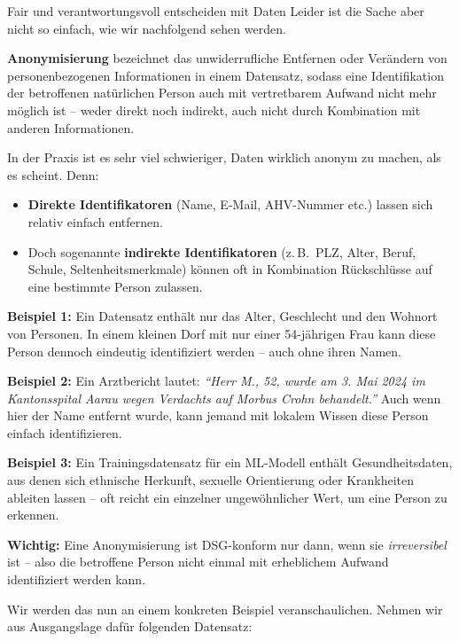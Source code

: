 \begin{lpu}{Fair und verantwortungsvoll entscheiden mit Daten}
Leider ist die Sache aber nicht so einfach, wie wir nachfolgend sehen werden.


\begin{theorie}\textbf{Anonymisierung} bezeichnet das unwiderrufliche Entfernen oder Verändern von personenbezogenen Informationen in einem Datensatz, sodass eine Identifikation der betroffenen natürlichen Person auch mit vertretbarem Aufwand nicht mehr möglich ist – weder direkt noch indirekt, auch nicht durch Kombination mit anderen Informationen.
\end{theorie}

In der Praxis ist es sehr viel schwieriger, Daten wirklich anonym zu machen, als es scheint. Denn:

\begin{itemize}
  \item \textbf{Direkte Identifikatoren} (Name, E-Mail, AHV-Nummer etc.) lassen sich relativ einfach entfernen.
  \item Doch sogenannte \textbf{indirekte Identifikatoren} (z.\,B.\ PLZ, Alter, Beruf, Schule, Seltenheitsmerkmale) können oft in Kombination Rückschlüsse auf eine bestimmte Person zulassen.
\end{itemize}

\vspace{0.5em}
\textbf{Beispiel 1:}  
Ein Datensatz enthält nur das Alter, Geschlecht und den Wohnort von Personen. In einem kleinen Dorf mit nur einer 54-jährigen Frau kann diese Person dennoch eindeutig identifiziert werden – auch ohne ihren Namen.

\vspace{0.5em}
\textbf{Beispiel 2:}  
Ein Arztbericht lautet:  
\emph{``Herr M., 52, wurde am 3. Mai 2024 im Kantonsspital Aarau wegen Verdachts auf Morbus Crohn behandelt.''}  Auch wenn hier der Name entfernt wurde, kann jemand mit lokalem Wissen diese Person einfach identifizieren.

\vspace{0.5em}
\textbf{Beispiel 3:}  
Ein Trainingsdatensatz für ein ML-Modell enthält Gesundheitsdaten, aus denen sich ethnische Herkunft, sexuelle Orientierung oder Krankheiten ableiten lassen – oft reicht ein einzelner ungewöhnlicher Wert, um eine Person zu erkennen.

\textbf{Wichtig:} Eine Anonymisierung ist DSG-konform nur dann, wenn sie \emph{irreversibel} ist – also die betroffene Person nicht einmal mit erheblichem Aufwand identifiziert werden kann.

Wir werden das nun an einem konkreten Beispiel veranschaulichen. Nehmen wir aus Ausgangslage dafür folgenden Datensatz:


\end{lpu}
